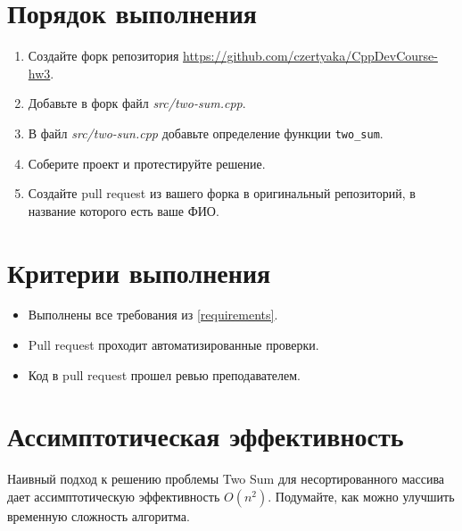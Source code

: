 \documentclass[14pt]{extarticle}
\begin{document}
\section{Порядок выполнения}

    \begin{enumerate}

        \item Создайте форк репозитория \url{https://github.com/czertyaka/CppDevCourse-hw3}.

        \item Добавьте в форк файл \textit{src/two-sum.cpp}.

        \item В файл \textit{src/two-sun.cpp} добавьте определение функции
            \verb|two_sum|.

        \item Соберите проект и протестируйте решение.

        \item Создайте pull request из вашего форка в оригинальный репозиторий,
            в название которого есть ваше ФИО.

    \end{enumerate}

\section{Критерии выполнения}

    \begin{itemize}

        \item Выполнены все требования из \ref{requirements}.

        \item Pull request проходит автоматизированные проверки.

        \item Код в pull request прошел ревью преподавателем.

    \end{itemize}

\section{Ассимптотическая эффективность\footnotemark{}}


    Наивный подход к решению проблемы Two Sum для несортированного массива
    дает ассимптотическую эффективность\footnotemark{} $O(n^2)$.
    Подумайте, как можно улучшить временную сложность алгоритма.

\end{document}
